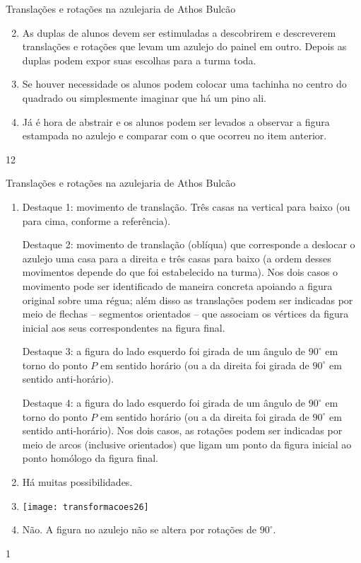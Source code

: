 \begin{sugestions}{Translações e rotações na azulejaria de Athos Bulcão}
{
\begin{enumerate}[label=\titem{\alph*)}]\setcounter{enumi}{1}
\item As duplas de alunos devem ser estimuladas a descobrirem e descreverem translações e rotações que levam um azulejo do painel em outro. Depois as duplas podem expor suas escolhas para a turma toda.
\item Se houver necessidade os alunos podem colocar uma tachinha no centro do quadrado ou simplesmente imaginar que há um pino ali.
\item Já é hora de abstrair e os alunos podem ser levados a observar a figura estampada no azulejo e comparar com o que ocorreu no item anterior.
\end{enumerate}
}{1}{2}
\end{sugestions}
\begin{answer}{Translações e rotações na azulejaria de Athos Bulcão}
{
\begin{enumerate}
\item Destaque 1: movimento de translação. Três casas na vertical para baixo (ou para cima, conforme a referência). 

Destaque 2: movimento de translação (oblíqua) que corresponde a deslocar o azulejo uma casa para a direita e três casas para baixo (a ordem desses movimentos depende do que foi estabelecido na turma). Nos dois casos o movimento pode ser identificado de maneira concreta apoiando a figura original sobre uma régua; além disso as translações podem ser indicadas por meio de flechas -- segmentos orientados -- que associam os vértices da figura inicial aos seus correspondentes na figura final. 

Destaque 3: a figura do lado esquerdo foi girada de um ângulo de $90^{\circ}$ em torno do ponto $P$ em sentido horário (ou a da direita foi girada de $90^{\circ}$ em sentido anti-horário). 

Destaque 4: a figura do lado esquerdo foi girada de um ângulo de $90^{\circ}$ em torno do ponto $P$ em sentido horário (ou a da direita foi girada de $90^{\circ}$ em sentido anti-horário). Nos dois casos, as rotações podem ser indicadas por meio de arcos (inclusive orientados) que ligam um ponto da figura inicial ao ponto homólogo da figura final.

\item Há muitas possibilidades.

\item {}
{
\texttt{[image: transformacoes26]}
}

\item Não. A figura no azulejo não se altera por rotações de $90^{\circ}$.  
\end{enumerate}
}{1}
\end{answer}

